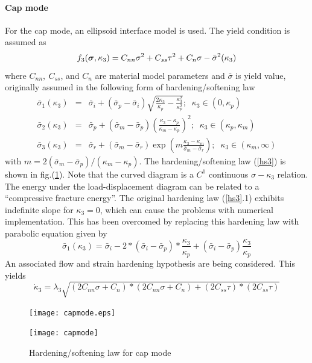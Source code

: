 \documentclass[a4paper]{article}
\newcommand{\mbf}[1]{\mbox{\boldmath$#1$}}
\newcommand{\del}[2]{\mbox{$\displaystyle\frac{#1}{#2}$}}
\newcommand{\sig}{\mbf{\sigma}}
\begin{document}
\paragraph{Cap mode}
For the cap mode, an ellipsoid interface model is used. The yield condition is assumed as
\begin{equation}
  f_3(\sig, \kappa_3) = C_{nn}\sigma^2+C_{ss}\tau^2 + C_n\sigma-\bar{\sigma}^2(\kappa_3)
\end{equation}
where $C_{nn},\ C_{ss}$, and $C_n$ are material model parameters and $\bar{\sigma}$ is yield value, originally assumed in the following form of hardening/softening law \cite{Rots}
\begin{eqnarray}
  \nonumber
  \bar{\sigma}_1(\kappa_3)&=&\bar{\sigma}_i+(\bar{\sigma}_p-\bar{\sigma}_i)\sqrt{\del{2\kappa_3}{\kappa_p}-\del{\kappa_3^2}{\kappa_p^2}};\;\;\kappa_3\in(0,\kappa_p)\\
  \label{hs3}
  \bar{\sigma}_2(\kappa_3)&=&\bar{\sigma}_p+(\bar{\sigma}_m-\bar{\sigma}_p)\left(\del{\kappa_3-\kappa_p}{\kappa_m-\kappa_p}\right)^2;\;\;\kappa_3\in(\kappa_p, \kappa_m)\\
  \nonumber
  \bar{\sigma}_3(\kappa_3)&=&\bar{\sigma}_r+(\bar{\sigma}_m-\bar{\sigma}_r)\exp\left(m\del{\kappa_3-\kappa_m}{\bar{\sigma}_m-\bar{\sigma}_r}\right);\;\;\kappa_3\in(\kappa_m, \infty)
\end{eqnarray}
with $m=2(\bar{\sigma}_m-\bar{\sigma}_p)/(\kappa_m-\kappa_p)$. The hardening/softening law (\ref{hs3}) is shown in fig.(\ref{hs3fig}). Note that the curved diagram is a $C^1$ continuous $\sigma-\kappa_3$ relation. The energy under the load-displacement diagram can be related to a ``compressive fracture energy''.
The original hardening law (\ref{hs3}.1) exhibits indefinite slope for $\kappa_3=0$, which can cause the problems with numerical implementation. This has been overcomed by replacing this hardening law with parabolic equation given by
\begin{equation}
  \bar{\sigma}_1(\kappa_3) = \bar{\sigma}_i-2*(\bar{\sigma}_i-\bar{\sigma}_p)*\del{\kappa_3}{\kappa_p}+(\bar{\sigma}_i-\bar{\sigma}_p)\del{\kappa_3}{\kappa_p}
\end{equation}
An associated flow and strain hardening hypothesis are being considered. This yields
\begin{equation}
  \dot\kappa_3=\lambda_3\sqrt{(2C_{nn}\sigma+C_n)*(2C_{nn}\sigma+C_n) + (2C_{ss}\tau)*(2C_{ss}\tau)}
\end{equation}
\begin{figure}[!htb]
\begin{htmlonly}
  \centerline{\texttt{[image: capmode.eps]}}
\end{htmlonly}
\centerline{\texttt{[image: capmode]}}
\caption{Hardening/softening law for cap mode}
\label{hs3fig}
\end{figure}
\end{document}
